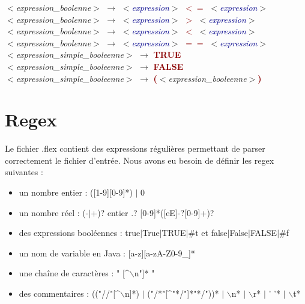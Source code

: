 \documentclass{article}
\newcommand{\blu}[1]{\textcolor{darkblue}{#1}}
\newcommand{\red}[1]{\textcolor{darkred}{#1}}
\begin{document}
\begin{center}
{\begin{minipage}{0.8\textwidth}
$<$\textit{expression\_boolenne}$>$ $\rightarrow$ $<$\textit{\blu{expression}}$>$ \red{\textbf{$<=$}} $<$\textit{\blu{expression}}$>$\\
$<$\textit{expression\_boolenne}$>$ $\rightarrow$ $<$\textit{\blu{expression}}$>$ \red{\textbf{$>$}} $<$\textit{\blu{expression}}$>$\\
$<$\textit{expression\_boolenne}$>$ $\rightarrow$ $<$\textit{\blu{expression}}$>$ \red{\textbf{$<$}} $<$\textit{\blu{expression}}$>$\\
$<$\textit{expression\_boolenne}$>$ $\rightarrow$ $<$\textit{\blu{expression}}$>$ \red{\textbf{$==$}} $<$\textit{\blu{expression}}$>$\\
$<$\textit{expression\_simple\_booleenne}$>$ $\rightarrow$ \textbf{\red{TRUE}}\\
$<$\textit{expression\_simple\_booleenne}$>$ $\rightarrow$ \textbf{\red{FALSE}}\\
$<$\textit{expression\_simple\_booleenne}$>$ $\rightarrow$ \textbf{\red{(}}$<$\textit{expression\_booleenne}$>$\textbf{\red{)}}\\	
\end{minipage}}
\end{center}

\section{Regex}
Le fichier .flex contient des expressions régulières permettant de parser correctement le fichier d'entrée. Nous avons eu besoin de définir les regex suivantes :\\
\begin{itemize}
\item un nombre entier : ([1-9][0-9]*) $\vert$ 0
\item un nombre réel : (-$\vert$+)? entier .? [0-9]*([eE]-?[0-9]+)?
\item des expressions booléennes : true$\vert$True$\vert$TRUE$\vert$\#t et false$\vert$False$\vert$FALSE$\vert$\#f
\item un nom de variable en Java : [a-z][a-zA-Z0-9\_]* 
\item une chaîne de caractères : " [\^\space $\backslash$n"]* "
\item des commentaires : (("//"[\^\space $\backslash$n]*) $\vert$ ("/*"[\^\space"*/"]*"*/"))* $\vert$ $\backslash$n* $\vert$ $\backslash$r* $\vert$ ' '* $\vert$ $\backslash$t* 
\end{itemize}
\end{document}
